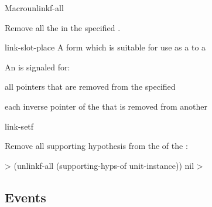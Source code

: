\documentclass[10pt,twoside,english,pdftex]{article}
\begin{document}
\begin{functiondoc}{Macro}{unlinkf-all}{}
%
%

\fnsyntax

\fnpurpose Remove all the  in the specified
.

\fnpackage {}

\fnmodule {}

\fnargs
\begin{args}{link-slot-place}
 A form which is suitable for use as a
 to a 
\end{args}

\fnevents
{}%
%
%
%
%
%
An  is signaled for:
\begin{tightitemize}
\item all pointers that are removed from the specified
\item each inverse pointer of the  that is removed from
  another 
\end{tightitemize}

\begin{alsos}{link-setf}
\also[linkf]
\also[unlinkf]
\end{alsos}

\fnexample
Remove all supporting hypothesis  from the
  of the 
 :  
%
\W\supp
\begin{example}
  > (unlinkf-all (supporting-hyps-of unit-instance))
  nil
  >
\end{example}

\end{functiondoc}


\W\renewcommand{\subsubentities}{1}

\T\markright{}%
\T\pagestyle{plain}
\T\clearpage
\W{}
\T\pagestyle{fancy}
\T\thispagestyle{fancybottom}
\T\global\def\fnlastname{ }%

\subsection{Events}
\label{sec:events}%
\end{document}
